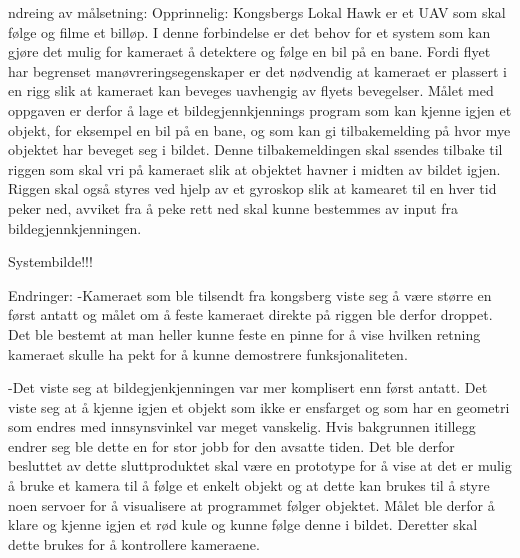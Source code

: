 ndreing av målsetning:
Opprinnelig: Kongsbergs Lokal Hawk er et UAV som skal følge og filme et billøp. I denne forbindelse er det behov for et system som kan gjøre det mulig for kameraet å detektere og følge en bil på en bane. Fordi flyet har begrenset manøvreringsegenskaper er det nødvendig at kameraet er plassert i en rigg slik at kameraet kan beveges uavhengig av flyets bevegelser. Målet med oppgaven er derfor å lage et bildegjennkjennings program som kan kjenne igjen et objekt, for eksempel en bil på en bane, og som kan gi tilbakemelding på hvor mye objektet har beveget seg i bildet. Denne tilbakemeldingen skal ssendes tilbake til riggen som skal vri på kameraet slik at objektet havner i midten av bildet igjen. Riggen skal også styres ved hjelp av et gyroskop slik at kamearet til en hver tid peker ned, avviket fra å peke rett ned skal kunne bestemmes av input fra bildegjennkjenningen. 

Systembilde!!!

Endringer:
-Kameraet som ble tilsendt fra kongsberg viste seg å være større en først antatt og målet om å feste kameraet direkte på riggen ble derfor droppet. Det ble bestemt at man heller kunne feste en pinne for å vise hvilken retning kameraet skulle ha pekt for å kunne demostrere funksjonaliteten. 

-Det viste seg at bildegjenkjenningen var mer komplisert enn først antatt. Det viste seg at å kjenne igjen et objekt som ikke er ensfarget og som har en geometri som endres med innsynsvinkel  var meget vanskelig. Hvis bakgrunnen itillegg endrer seg ble dette en for stor jobb for den avsatte tiden. Det ble derfor besluttet av dette sluttproduktet skal være en prototype for å vise at det er mulig å bruke et kamera til å følge et enkelt objekt og at dette kan brukes til å styre noen servoer for å visualisere at programmet følger objektet. Målet ble derfor å klare og kjenne igjen et rød kule og kunne følge denne i bildet. Deretter skal dette brukes for å kontrollere kameraene. 
